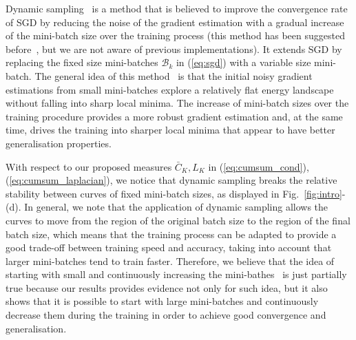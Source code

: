 \documentclass[10pt,journal,compsoc]{IEEEtran}
\begin{document}
Dynamic sampling~\cite{friedlander2012hybrid, byrd2012sample} is a method that is believed to improve the convergence rate of SGD by reducing the noise of the gradient estimation with a gradual increase of the mini-batch size over the training process (this method has been suggested before~\cite{friedlander2012hybrid, byrd2012sample}, but we are not aware of previous implementations).  It extends SGD by replacing the fixed size mini-batches $\mathcal{B}_k$ in (\ref{eq:sgd}) with a variable size mini-batch.  
The general idea of this method~\cite{friedlander2012hybrid, byrd2012sample} is that the initial noisy gradient estimations from small mini-batches explore a relatively flat energy landscape without falling into sharp local minima. %
The increase of mini-batch sizes over the training procedure provides a more robust gradient estimation and, at the same time, drives the training into sharper local minima that appear to have better generalisation properties.

With respect to our proposed measures $\bar{C}_K,L_K$ in (\ref{eq:cumsum_cond}),(\ref{eq:cumsum_laplacian}), we notice that dynamic sampling breaks the relative stability between curves of fixed mini-batch sizes, as displayed in Fig.~\ref{fig:intro}-(d).  In general, we note that the application of dynamic sampling allows the curves to move from the region of the original batch size to the region of the final batch size, which means that the training process can be adapted to provide a good trade-off between training speed and accuracy, taking into account that larger mini-batches tend to train faster.  Therefore, we believe that the idea of starting with small and continuously increasing the mini-bathes~\cite{friedlander2012hybrid, byrd2012sample} is just partially true because our results provides evidence not only for such idea, but it also shows that it is possible to start with large mini-batches and continuously decrease them during the training in order to achieve good convergence and generalisation.
\end{document}
